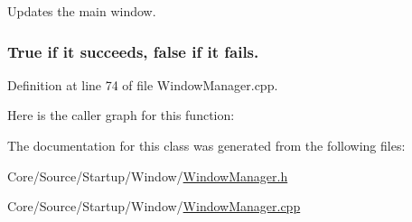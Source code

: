 Updates the main window. 





\subsubsection*{True if it succeeds, false if it fails.  }

Definition at line 74 of file Window\+Manager.\+cpp.

Here is the caller graph for this function\+:


The documentation for this class was generated from the following files\+:\begin{DoxyCompactItemize}
\item 
Core/\+Source/\+Startup/\+Window/\mbox{\hyperlink{_window_manager_8h}{Window\+Manager.\+h}}\item 
Core/\+Source/\+Startup/\+Window/\mbox{\hyperlink{_window_manager_8cpp}{Window\+Manager.\+cpp}}\end{DoxyCompactItemize}
